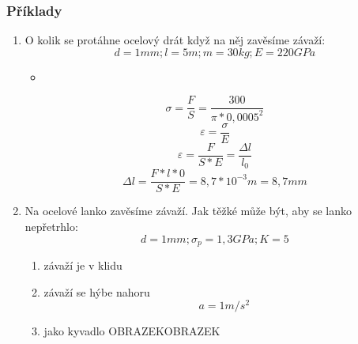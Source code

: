 \documentclass{article}
\begin{document}
        \subsubsection{Příklady}
        \begin{enumerate}
          \item O kolik se protáhne ocelový drát když na něj zavěsíme závaží:
          \begin{equation*}
            d = 1 mm;
            l = 5 m;
            m = 30 kg;
            E = 220 GPa
          \end{equation*}
          \begin{itemize}
            \item[]
          \end{itemize}
          \begin{equation*}
            \sigma=\frac{F}{S}=\frac{300}{\pi*0,0005^2}
          \end{equation*}
          \begin{equation*}
            \varepsilon = \frac{\sigma}{E}
          \end{equation*}
          \begin{equation*}
            \varepsilon = \frac{F}{S*E}=\frac{\Delta l}{l_0}
          \end{equation*}
          \begin{equation*}
            \Delta l = \frac{F*l*0}{S*E}=8,7*10^{-3} m = 8,7 mm
          \end{equation*}
          \item Na ocelové lanko zavěsíme závaží. Jak těžké může být, aby se lanko nepřetrhlo:
          \begin{equation*}
            d = 1 mm;
            \sigma_p = 1,3 GPa;
            K = 5
          \end{equation*}
          \begin{enumerate}
            \item závaží je v klidu
            \item závaží se hýbe nahoru
            \begin{equation*}
              a = 1 m/s^2
            \end{equation*}
            \item jako kyvadlo OBRAZEKOBRAZEK
          \end{enumerate}
        \end{enumerate}
\end{document}
